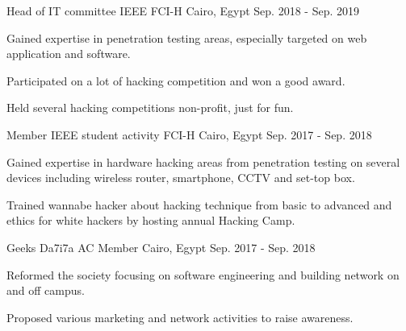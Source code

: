 

\begin{cventries}

  \cventry
    {Head of IT committee} %
    {IEEE FCI-H} %
    {Cairo, Egypt} %
    {Sep. 2018 - Sep. 2019} %
    {
      \begin{cvitems} %
        \item {Gained expertise in penetration testing areas, especially targeted on web application and software.}
        \item {Participated on a lot of hacking competition and won a good award.}
        \item {Held several hacking competitions non-profit, just for fun.}
      \end{cvitems}
    }

  \cventry
    {Member} %
    {IEEE student activity FCI-H} %
    {Cairo, Egypt} %
    {Sep. 2017 - Sep. 2018} %
    {
      \begin{cvitems} %
        \item {Gained expertise in hardware hacking areas from penetration testing on several devices including wireless router, smartphone, CCTV and set-top box.}
        \item {Trained wannabe hacker about hacking technique from basic to advanced and ethics for white hackers by hosting annual Hacking Camp.}
      \end{cvitems}
    }

  \cventry
    {Geeks Da7i7a} %
    {AC Member} %
    {Cairo, Egypt} %
    {Sep. 2017 - Sep. 2018} %
    {
      \begin{cvitems} %
        \item {Reformed the society focusing on software engineering and building network on and off campus.}
        \item {Proposed various marketing and network activities to raise awareness.}
      \end{cvitems}
    }


\end{cventries}
